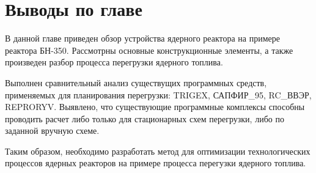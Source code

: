 \section{Выводы по главе}

В данной главе приведен обзор устройства ядерного реактора на примере реактора БН-350.
Рассмотрны основные конструкционные элементы, а также произведен разбор процесса перегрузки ядерного топлива.

Выполнен сравнительный анализ существущих программных средств, применяемых для планирования перегрузки: TRIGEX, САПФИР\_95, RC\_ВВЭР, REPRORYV.
Выявлено, что существующие программные комплексы способны проводить расчет либо только для стационарных схем перегрузки, либо по заданной вручную схеме.

Таким образом, необходимо разработать метод для оптимизации технологических процессов ядерных реакторов на примере процесса перегузки ядерного топлива.
